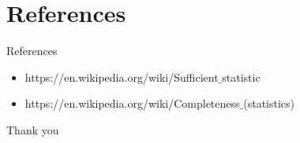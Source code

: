 \documentclass[aspectratio=169,xcolor=dvipsnames]{beamer}
\begin{document}
\section{References}

\begin{frame}{References}
   \begin{itemize}
       \item https://en.wikipedia.org/wiki/Sufficient$\_$statistic
       \item https://en.wikipedia.org/wiki/Completeness$\_$(statistics)
   \end{itemize}


\end{frame}

\begingroup
{} %
\begin{frame}
  \Huge{\centerline{Thank you}}
\end{frame}
\endgroup

\end{document}

